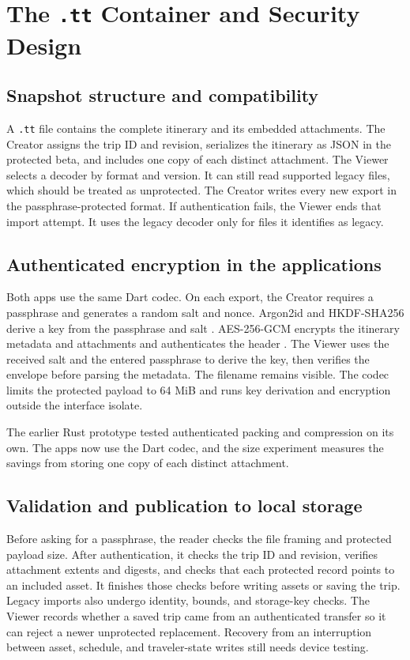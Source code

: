 \section{The \texttt{.tt} Container and Security Design}
\label{sec:container}

\subsection{Snapshot structure and compatibility}
A \texttt{.tt} file contains the complete itinerary and its embedded attachments. The Creator assigns the trip ID and revision, serializes the itinerary as JSON in the protected beta, and includes one copy of each distinct attachment. The Viewer selects a decoder by format and version. It can still read supported legacy files, which should be treated as unprotected. The Creator writes every new export in the passphrase-protected format. If authentication fails, the Viewer ends that import attempt. It uses the legacy decoder only for files it identifies as legacy.

\subsection{Authenticated encryption in the applications}
Both apps use the same Dart codec. On each export, the Creator requires a passphrase and generates a random salt and nonce. Argon2id and HKDF-SHA256 derive a key from the passphrase and salt \cite{argonrfc,hkdfrfc}. AES-256-GCM encrypts the itinerary metadata and attachments and authenticates the header \cite{gcm}. The Viewer uses the received salt and the entered passphrase to derive the key, then verifies the envelope before parsing the metadata. The filename remains visible. The codec limits the protected payload to 64 MiB and runs key derivation and encryption outside the interface isolate.

The earlier Rust prototype tested authenticated packing and compression on its own. The apps now use the Dart codec, and the size experiment measures the savings from storing one copy of each distinct attachment.



\subsection{Validation and publication to local storage}
Before asking for a passphrase, the reader checks the file framing and protected payload size. After authentication, it checks the trip ID and revision, verifies attachment extents and digests, and checks that each protected record points to an included asset. It finishes those checks before writing assets or saving the trip. Legacy imports also undergo identity, bounds, and storage-key checks. The Viewer records whether a saved trip came from an authenticated transfer so it can reject a newer unprotected replacement. Recovery from an interruption between asset, schedule, and traveler-state writes still needs device testing.

